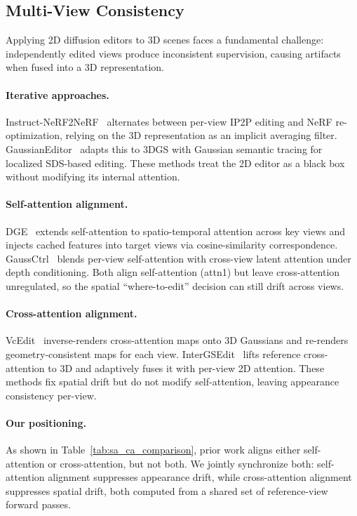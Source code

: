 \subsection{Multi-View Consistency}

Applying 2D diffusion editors to 3D scenes faces a fundamental challenge: independently edited views produce inconsistent supervision, causing artifacts when fused into a 3D representation.

\paragraph{Iterative approaches.}
Instruct-NeRF2NeRF~\cite{haque2023instructnerf2nerf} alternates between per-view IP2P editing and NeRF re-optimization, relying on the 3D representation as an implicit averaging filter.
GaussianEditor~\cite{wang2024gaussianeditor} adapts this to 3DGS with Gaussian semantic tracing for localized SDS-based editing.
These methods treat the 2D editor as a black box without modifying its internal attention.

\paragraph{Self-attention alignment.}
DGE~\cite{chen2024dge} extends self-attention to spatio-temporal attention across key views and injects cached features into target views via cosine-similarity correspondence.
GaussCtrl~\cite{wu2024gaussctrl} blends per-view self-attention with cross-view latent attention under depth conditioning.
Both align self-attention (attn1) but leave cross-attention unregulated, so the spatial ``where-to-edit'' decision can still drift across views.

\paragraph{Cross-attention alignment.}
VcEdit~\cite{wang2024vcedit} inverse-renders cross-attention maps onto 3D Gaussians and re-renders geometry-consistent maps for each view.
InterGSEdit~\cite{wen2025intergsedit} lifts reference cross-attention to 3D and adaptively fuses it with per-view 2D attention.
These methods fix spatial drift but do not modify self-attention, leaving appearance consistency per-view.

\paragraph{Our positioning.}
As shown in Table~\ref{tab:sa_ca_comparison}, prior work aligns either self-attention or cross-attention, but not both.
We jointly synchronize both: self-attention alignment suppresses appearance drift, while cross-attention alignment suppresses spatial drift, both computed from a shared set of reference-view forward passes.

